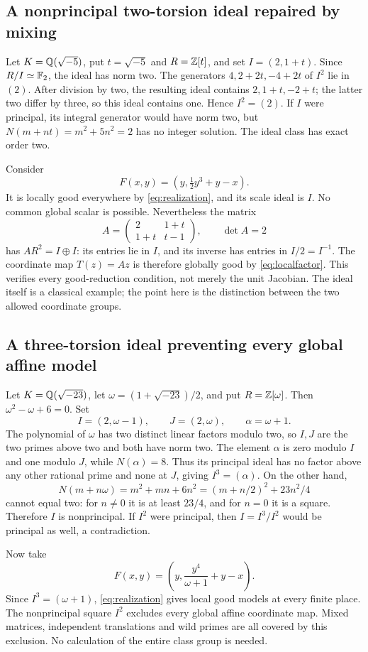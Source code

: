\subsection{A nonprincipal two-torsion ideal repaired by mixing}
Let $K=\mathbb Q(\sqrt{-5})$, put $t=\sqrt{-5}$ and $R=\mathbb Z[t]$, and set
$I=(2,1+t)$. Since $R/I\simeq\mathbb F_2$, the ideal has norm two.
The generators $4,2+2t,-4+2t$ of $I^2$ lie in $(2)$.
After division by two, the resulting ideal contains
$2,1+t,-2+t$; the latter two differ by three, so this ideal contains
one. Hence $I^2=(2)$. If $I$ were principal, its integral generator
would have norm two, but
$N(m+nt)=m^2+5n^2=2$ has no integer solution. The ideal class has
exact order two.

Consider
\begin{equation}\label{eq:twoexample}
 F(x,y)=\left(y,\tfrac12y^3+y-x\right).
\end{equation}
It is locally good everywhere by \eqref{eq:realization}, and its
scale ideal is $I$. No common global scalar is possible. Nevertheless
the matrix
\begin{equation}\label{eq:explicitmatrix}
 A=\begin{pmatrix}2&1+t\\1+t&t-1\end{pmatrix},\qquad\det A=2
\end{equation}
has $AR^2=I\oplus I$: its entries lie in $I$, and its inverse has
entries in $I/2=I^{-1}$. The coordinate map $T(z)=Az$ is therefore
globally good by \eqref{eq:localfactor}. This verifies every
good-reduction condition, not merely the unit Jacobian. The ideal
itself is a classical example; the point here is the distinction
between the two allowed coordinate groups.

\subsection{A three-torsion ideal preventing every global affine model}
Let $K=\mathbb Q(\sqrt{-23})$, let
$\omega=(1+\sqrt{-23})/2$, and put $R=\mathbb Z[\omega]$.
Then $\omega^2-\omega+6=0$. Set
\[
 I=(2,\omega-1),\qquad J=(2,\omega),\qquad\alpha=\omega+1.
\]
The polynomial of $\omega$ has two distinct linear factors modulo
two, so $I,J$ are the two primes above two and both have norm two.
The element $\alpha$ is zero modulo $I$ and one modulo $J$, while
$N(\alpha)=8$. Thus its principal ideal has no factor above any
other rational prime and none at $J$, giving $I^3=(\alpha)$.
On the other hand,
\[
 N(m+n\omega)=m^2+mn+6n^2
 =(m+n/2)^2+23n^2/4
\]
cannot equal two: for $n\ne0$ it is at least $23/4$, and for $n=0$
it is a square. Therefore $I$ is nonprincipal. If $I^2$ were
principal, then $I=I^3/I^2$ would be principal as well, a contradiction.

Now take
\begin{equation}\label{eq:threeexample}
 F(x,y)=\left(y,\frac{y^4}{\omega+1}+y-x\right).
\end{equation}
Since $I^3=(\omega+1)$, \eqref{eq:realization} gives local good
models at every finite place. The nonprincipal square $I^2$ excludes
every global affine coordinate map. Mixed matrices, independent
translations and wild primes are all covered by this exclusion.
No calculation of the entire class group is needed.
